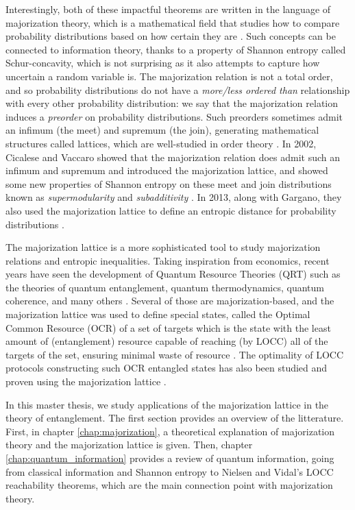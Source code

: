 Interestingly, both of these impactful theorems are written in the language of majorization theory, which is a mathematical field that studies how to compare probability distributions based on how certain they are \cite{marshall_inequalities_2011}. Such concepts can be connected to information theory, thanks to a property of Shannon entropy called Schur-concavity, which is not surprising as it also attempts to capture how uncertain a random variable is. The majorization relation is not a total order, and so probability distributions do not have a \textit{more/less ordered than} relationship with every other probability distribution: we say that the majorization relation induces a \textit{preorder} on probability distributions. Such preorders sometimes admit an infimum (the meet) and supremum (the join), generating mathematical structures called lattices, which are well-studied in order theory \cite{davey_introduction_2002}. In 2002, Cicalese and Vaccaro showed that the majorization relation does admit such an infimum and supremum and introduced the majorization lattice, and showed some new properties of Shannon entropy on these meet and join distributions known as \textit{supermodularity} and \textit{subadditivity} \cite{cicalese_supermodularity_2002}. In 2013, along with Gargano, they also used the majorization lattice to define an entropic distance for probability distributions \cite{cicalese_information_2013}.

The majorization lattice is a more sophisticated tool to study majorization relations and entropic inequalities. Taking inspiration from economics, recent years have seen the development of Quantum Resource Theories (QRT) such as the theories of quantum entanglement, quantum thermodynamics, quantum coherence, and many others \cite{chitambar_quantum_2019}. Several of those are majorization-based, and the majorization lattice was used to define special states, called the Optimal Common Resource (OCR) of a set of targets which is the state with the least amount of (entanglement) resource capable of reaching (by LOCC) all of the targets of the set, ensuring minimal waste of resource \cite{bosyk_optimal_2019}. The optimality of LOCC protocols constructing such OCR entangled states has also been studied and proven using the majorization lattice \cite{deside_probabilistic_2024}.

In this master thesis, we study applications of the majorization lattice in the theory of entanglement. The first section provides an overview of the litterature. First, in chapter \ref{chap:majorization}, a theoretical explanation of majorization theory and the majorization lattice is given. Then, chapter \ref{chap:quantum_information} provides a review of quantum information, going from classical information and Shannon entropy to Nielsen and Vidal's LOCC reachability theorems, which are the main connection point with majorization theory.

